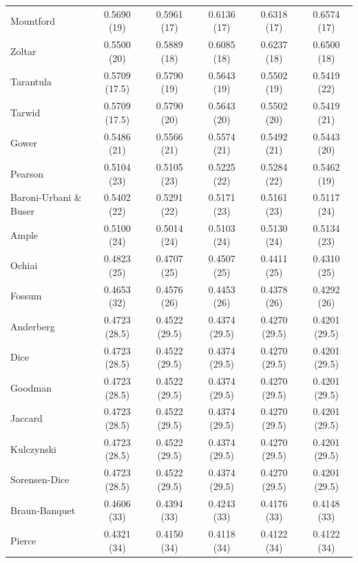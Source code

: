 \begin{table}[t]
{\begin{tabular}{lccccc}
Mountford & 0.5690 (19) & 0.5961 (17) & 0.6136 (17) & 0.6318 (17) & 0.6574 (17) \\
Zoltar & 0.5500 (20) & 0.5889 (18) & 0.6085 (18) & 0.6237 (18) & 0.6500 (18) \\
Tarantula & 0.5709 (17.5) & 0.5790 (19) & 0.5643 (19) & 0.5502 (19) & 0.5419 (22) \\
Tarwid & 0.5709 (17.5) & 0.5790 (20) & 0.5643 (20) & 0.5502 (20) & 0.5419 (21) \\
Gower & 0.5486 (21) & 0.5566 (21) & 0.5574 (21) & 0.5492 (21) & 0.5443 (20) \\
Pearson & 0.5104 (23) & 0.5105 (23) & 0.5225 (22) & 0.5284 (22) & 0.5462 (19) \\
Baroni-Urbani \& Buser & 0.5402 (22) & 0.5291 (22) & 0.5171 (23) & 0.5161 (23) & 0.5117 (24) \\
Ample & 0.5100 (24) & 0.5014 (24) & 0.5103 (24) & 0.5130 (24) & 0.5134 (23) \\
Ochiai & 0.4823 (25) & 0.4707 (25) & 0.4507 (25) & 0.4411 (25) & 0.4310 (25) \\
Fossum & 0.4653 (32) & 0.4576 (26) & 0.4453 (26) & 0.4378 (26) & 0.4292 (26) \\
Anderberg & 0.4723 (28.5) & 0.4522 (29.5) & 0.4374 (29.5) & 0.4270 (29.5) & 0.4201 (29.5) \\
Dice & 0.4723 (28.5) & 0.4522 (29.5) & 0.4374 (29.5) & 0.4270 (29.5) & 0.4201 (29.5) \\
Goodman & 0.4723 (28.5) & 0.4522 (29.5) & 0.4374 (29.5) & 0.4270 (29.5) & 0.4201 (29.5) \\
Jaccard & 0.4723 (28.5) & 0.4522 (29.5) & 0.4374 (29.5) & 0.4270 (29.5) & 0.4201 (29.5) \\
Kulczynski & 0.4723 (28.5) & 0.4522 (29.5) & 0.4374 (29.5) & 0.4270 (29.5) & 0.4201 (29.5) \\
Sorensen-Dice & 0.4723 (28.5) & 0.4522 (29.5) & 0.4374 (29.5) & 0.4270 (29.5) & 0.4201 (29.5) \\
Braun-Banquet & 0.4606 (33) & 0.4394 (33) & 0.4243 (33) & 0.4176 (33) & 0.4148 (33) \\
Pierce & 0.4321 (34) & 0.4150 (34) & 0.4118 (34) & 0.4122 (34) & 0.4122 (34) \\
\bottomrule
\end{tabular}
}
\end{table}
